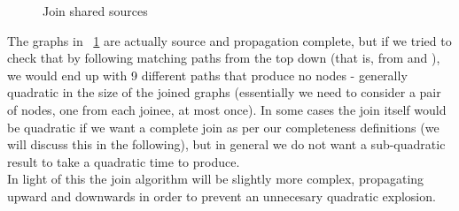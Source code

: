 \begin{figure}[H]
\caption{
Join shared sources
}
\label{snippet3.20_graph}
\end{figure}
The graphs in ~\ref{snippet3.20_graph} are actually source and propagation complete, 
but if we tried to check that by following matching paths from the top down 
(that is, from  and ), we would end up with 9 different paths that produce no nodes - generally quadratic in the size of the joined graphs (essentially we need to consider a pair of nodes, one from each joinee, at most once). In some cases the join itself would be quadratic if we want a complete join as per our completeness definitions (we will discuss this in the following), but in general we do not want a sub-quadratic result to take a quadratic time to produce.\\
In light of this the join algorithm will be slightly more complex, propagating upward and downwards in order to prevent an unnecesary quadratic explosion.

